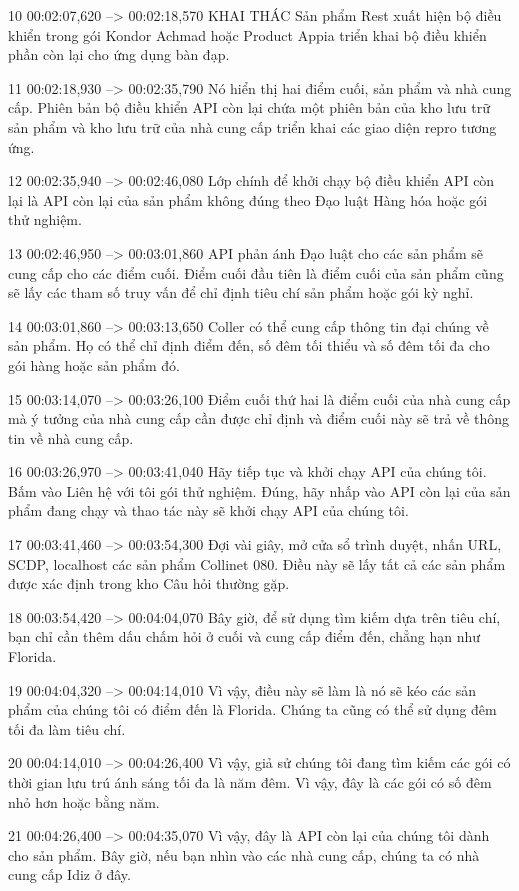 10
00:02:07,620 --> 00:02:18,570
KHAI THÁC Sản phẩm Rest xuất hiện bộ điều khiển trong gói Kondor Achmad hoặc Product Appia triển khai bộ điều khiển phần còn lại cho ứng dụng bàn đạp.

11
00:02:18,930 --> 00:02:35,790
Nó hiển thị hai điểm cuối, sản phẩm và nhà cung cấp.  Phiên bản bộ điều khiển API còn lại chứa một phiên bản của kho lưu trữ sản phẩm và kho lưu trữ của nhà cung cấp triển khai các giao diện repro tương ứng.

12
00:02:35,940 --> 00:02:46,080
Lớp chính để khởi chạy bộ điều khiển API còn lại là API còn lại của sản phẩm không đúng theo Đạo luật Hàng hóa hoặc gói thử nghiệm.

13
00:02:46,950 --> 00:03:01,860
API phản ánh Đạo luật cho các sản phẩm sẽ cung cấp cho các điểm cuối.  Điểm cuối đầu tiên là điểm cuối của sản phẩm cũng sẽ lấy các tham số truy vấn để chỉ định tiêu chí sản phẩm hoặc gói kỳ nghỉ.

14
00:03:01,860 --> 00:03:13,650
Coller có thể cung cấp thông tin đại chúng về sản phẩm.  Họ có thể chỉ định điểm đến, số đêm tối thiểu và số đêm tối đa cho gói hàng hoặc sản phẩm đó.

15
00:03:14,070 --> 00:03:26,100
Điểm cuối thứ hai là điểm cuối của nhà cung cấp mà ý tưởng của nhà cung cấp cần được chỉ định và điểm cuối này sẽ trả về thông tin về nhà cung cấp.

16
00:03:26,970 --> 00:03:41,040
Hãy tiếp tục và khởi chạy API của chúng tôi.  Bấm vào Liên hệ với tôi gói thử nghiệm.  Đúng, hãy nhấp vào API còn lại của sản phẩm đang chạy và thao tác này sẽ khởi chạy API của chúng tôi.

17
00:03:41,460 --> 00:03:54,300
Đợi vài giây, mở cửa sổ trình duyệt, nhấn URL, SCDP, localhost các sản phẩm Collinet 080.  Điều này sẽ lấy tất cả các sản phẩm được xác định trong kho Câu hỏi thường gặp.

18
00:03:54,420 --> 00:04:04,070
Bây giờ, để sử dụng tìm kiếm dựa trên tiêu chí, bạn chỉ cần thêm dấu chấm hỏi ở cuối và cung cấp điểm đến, chẳng hạn như Florida.

19
00:04:04,320 --> 00:04:14,010
Vì vậy, điều này sẽ làm là nó sẽ kéo các sản phẩm của chúng tôi có điểm đến là Florida.  Chúng ta cũng có thể sử dụng đêm tối đa làm tiêu chí.

20
00:04:14,010 --> 00:04:26,400
Vì vậy, giả sử chúng tôi đang tìm kiếm các gói có thời gian lưu trú ánh sáng tối đa là năm đêm.  Vì vậy, đây là các gói có số đêm nhỏ hơn hoặc bằng năm.

21
00:04:26,400 --> 00:04:35,070
Vì vậy, đây là API còn lại của chúng tôi dành cho sản phẩm.  Bây giờ, nếu bạn nhìn vào các nhà cung cấp, chúng ta có nhà cung cấp Idiz ở đây.

